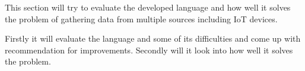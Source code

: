 This section will try to evaluate the developed language and how well it solves the problem of gathering data from multiple sources including IoT devices.

Firstly it will evaluate the language and some of its difficulties and come up with recommendation for improvements. 
Secondly will it look into how well it solves the problem.

